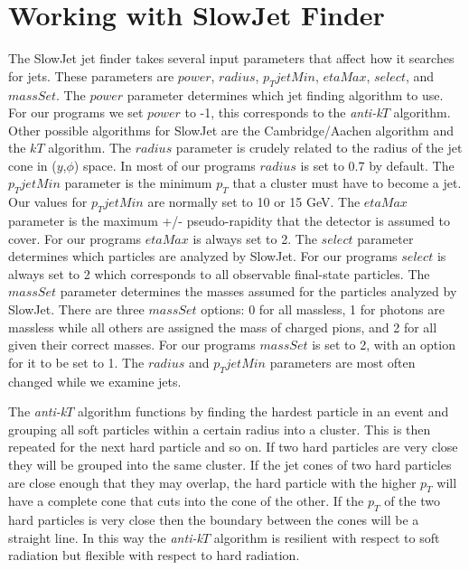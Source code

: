 \documentclass[11pt]{article}
\begin{document}
\section{Working with SlowJet Finder}
%
%
The SlowJet jet finder takes several input parameters that affect how it searches for jets. These parameters are $power$, $radius$, $p_TjetMin$, $etaMax$, $select$, and $massSet$. The $power$ parameter determines which jet finding algorithm to use. For our programs we set $power$ to -1, this corresponds to the {\it anti-k$T$} algorithm. Other possible algorithms for SlowJet are the Cambridge/Aachen algorithm and the $kT$ algorithm. The $radius$ parameter is crudely related to the radius of the jet cone in ($y$,$\phi$) space. In most of our programs $radius$ is set to 0.7 by default. The $p_TjetMin$ parameter is the minimum $p_T$ that a cluster must have to become a jet. Our values for $p_TjetMin$ are normally set to 10 or 15 GeV. The $etaMax$ parameter is the maximum +/- pseudo-rapidity that the detector is assumed to cover. For our programs $etaMax$ is always set to 2. The $select$ parameter determines which particles are analyzed by SlowJet. For our programs $select$ is always set to 2 which corresponds to all observable final-state particles. The $massSet$ parameter determines the masses assumed for the particles analyzed by SlowJet. There are three $massSet$ options: 0 for all massless, 1 for photons are massless while all others are assigned the mass of charged pions, and 2 for all given their correct masses. For our programs $massSet$ is set to 2, with an option for it to be set to 1. The $radius$ and $p_TjetMin$ parameters are most often changed while we examine jets.

The {\it anti-k$T$} algorithm functions by finding the hardest particle in an event and grouping all soft particles within a certain radius into a cluster. This is then repeated for the next hard particle and so on. If two hard particles are very close they will be grouped into the same cluster. If the jet cones of two hard particles are close enough that they may overlap, the hard particle with the higher $p_T$ will have a complete cone that cuts into the cone of the other. If the $p_T$ of the two hard particles is very close then the boundary between the cones will be a straight line. In this way the {\it anti-k$T$} algorithm is resilient with respect to soft radiation but flexible with respect to hard radiation.
\end{document}
